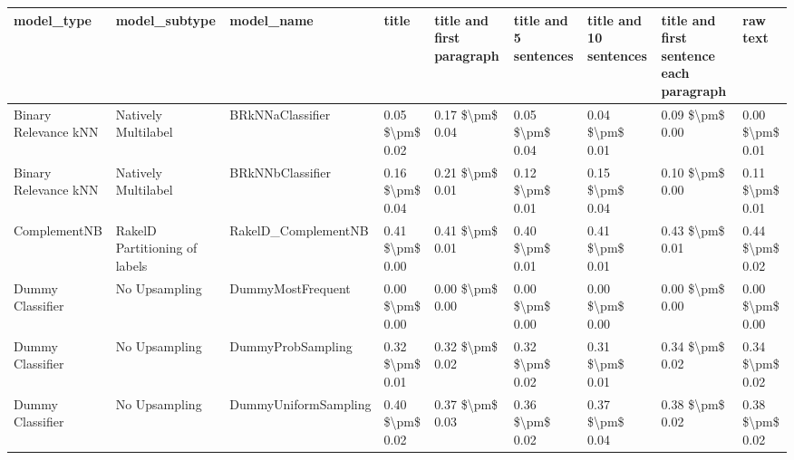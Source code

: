 \begin{tabular}{lllllllll}
\toprule
                     model\_type &                 model\_subtype &                                   model\_name &           title & title and first paragraph & title and 5 sentences & title and 10 sentences & title and first sentence each paragraph &            raw text \\
\midrule
           Binary Relevance kNN &           Natively Multilabel &                             BRkNNaClassifier & 0.05 \$\textbackslash pm\$ 0.02 &           0.17 \$\textbackslash pm\$ 0.04 &       0.05 \$\textbackslash pm\$ 0.04 &        0.04 \$\textbackslash pm\$ 0.01 &                         0.09 \$\textbackslash pm\$ 0.00 &     0.00 \$\textbackslash pm\$ 0.01 \\
           Binary Relevance kNN &           Natively Multilabel &                             BRkNNbClassifier & 0.16 \$\textbackslash pm\$ 0.04 &           0.21 \$\textbackslash pm\$ 0.01 &       0.12 \$\textbackslash pm\$ 0.01 &        0.15 \$\textbackslash pm\$ 0.04 &                         0.10 \$\textbackslash pm\$ 0.00 &     0.11 \$\textbackslash pm\$ 0.01 \\
                   ComplementNB & RakelD Partitioning of labels &                          RakelD\_ComplementNB & 0.41 \$\textbackslash pm\$ 0.00 &           0.41 \$\textbackslash pm\$ 0.01 &       0.40 \$\textbackslash pm\$ 0.01 &        0.41 \$\textbackslash pm\$ 0.01 &                         0.43 \$\textbackslash pm\$ 0.01 &     0.44 \$\textbackslash pm\$ 0.02 \\
               Dummy Classifier &                 No Upsampling &                            DummyMostFrequent & 0.00 \$\textbackslash pm\$ 0.00 &           0.00 \$\textbackslash pm\$ 0.00 &       0.00 \$\textbackslash pm\$ 0.00 &        0.00 \$\textbackslash pm\$ 0.00 &                         0.00 \$\textbackslash pm\$ 0.00 &     0.00 \$\textbackslash pm\$ 0.00 \\
               Dummy Classifier &                 No Upsampling &                            DummyProbSampling & 0.32 \$\textbackslash pm\$ 0.01 &           0.32 \$\textbackslash pm\$ 0.02 &       0.32 \$\textbackslash pm\$ 0.02 &        0.31 \$\textbackslash pm\$ 0.01 &                         0.34 \$\textbackslash pm\$ 0.02 &     0.34 \$\textbackslash pm\$ 0.02 \\
               Dummy Classifier &                 No Upsampling &                         DummyUniformSampling & 0.40 \$\textbackslash pm\$ 0.02 &           0.37 \$\textbackslash pm\$ 0.03 &       0.36 \$\textbackslash pm\$ 0.02 &        0.37 \$\textbackslash pm\$ 0.04 &                         0.38 \$\textbackslash pm\$ 0.02 &     0.38 \$\textbackslash pm\$ 0.02 \\

\end{tabular}
